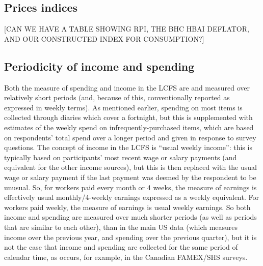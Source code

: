 \subsection{Prices indices}
[CAN WE HAVE A TABLE SHOWING RPI, THE BHC HBAI DEFLATOR, AND OUR CONSTRUCTED INDEX FOR CONSUMPTION?]

\subsection{Periodicity of income and spending}
Both the measure of spending and income in the LCFS are and measured over relatively short periods (and, because of this, conventionally reported as expressed in weekly terms). As mentioned earlier,  spending on most items is collected through diaries which cover a fortnight, but this is supplemented with estimates of the weekly spend on infrequently-purchased items, which are based on respondents' total spend over a longer period and given in response to survey questions. The concept of income in the LCFS is ``usual weekly income'': this is typically based on participants' most recent wage or salary payments (and equivalent for the other income sources), but this is then replaced with the usual wage or salary payment if the last payment was deemed by the respondent to be unusual.  So, for workers paid every month or 4 weeks, the measure of earnings is effectively usual monthly/4-weekly earnings expressed as a weekly equivalent. For workers paid weekly, the measure of earnings is usual weekly earnings.  So both income and spending are measured over much shorter periods (as well as periods that are similar to each other), than in the main US data (which measures income over the previous year, and spending over the previous quarter), but it is not the case that income and spending are collected for the same period of calendar time, as occurs, for example, in the Canadian FAMEX/SHS surveys.
